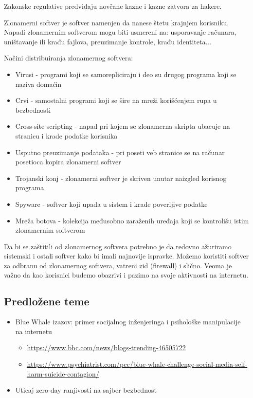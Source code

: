 \documentclass[a4paper,12pt]{article}
\begin{document}
Zakonske regulative predviđaju novčane kazne i kazne zatvora za hakere. 

Zlonamerni softver je softver namenjen da nanese štetu krajnjem korisniku. Napadi zlonamernim softverom mogu biti usmereni na: usporavanje računara, uništavanje ili krađu fajlova, preuzimanje kontrole, krađu identiteta...

Načini distribuiranja zlonamernog softvera:
\begin{itemize}
    \item Virusi - programi koji se samorepliciraju i deo su drugog programa koji se naziva domaćin
    \item Crvi - samostalni programi koji se šire na mreži korišćenjem rupa u bezbednosti
    \item Cross-site scripting - napad pri kojem se zlonamerna skripta ubacuje na stranicu i krade podatke korisnika 
    \item Usputno preuzimanje podataka - pri poseti veb stranice se na računar posetioca kopira zlonamerni softver
    \item Trojanski konj - zlonamerni softver je skriven unutar naizgled korisnog programa
    \item Spyware - softver koji upada u sistem i krade poverljive podatke 
    \item Mreža botova - kolekcija međusobno zaraženih uređaja koji se kontrolišu istim zlonamernim softverom
\end{itemize}

Da bi se zaštitili od zlonamernog softvera potrebno je da redovno ažuriramo sistemski i ostali softver kako bi imali najnovije ispravke. Možemo koristiti softver za odbranu od zlonamernog softvera, vatreni zid (firewall) i slično. Veoma je važno da kao korisnici budemo obazrivi i pazimo na svoje aktivnosti na internetu.

\subsection{Predložene teme}
\begin{itemize}
    \item Blue Whale izazov: primer socijalnog inženjeringa i psihološke manipulacije na internetu
    \begin{itemize}
            \item \small{\href{https://www.bbc.com/news/blogs-trending-46505722}{https://www.bbc.com/news/blogs-trending-46505722}}
            \item \small{\href{https://www.psychiatrist.com/pcc/blue-whale-challenge-social-media-self-harm-suicide-contagion/}{https://www.psychiatrist.com/pcc/blue-whale-challenge-social-media-self-harm-suicide-contagion/}}
            
    \end{itemize}
    \item Uticaj zero-day ranjivosti na sajber bezbednost
\end{itemize}
\end{document}
